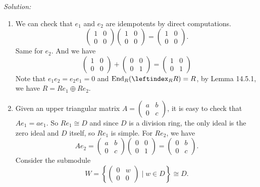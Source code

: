 \documentclass[a4paper, 12pt]{article}
\newenvironment{solution}
    {\textit{Solution:}}
    {}
\begin{document}
\begin{solution}
\begin{enumerate}[(1)]
\item We can check that \(e_1\) and \(e_2\) are idempotents by direct computations.
\[\begin{pmatrix}
    1&0\\ 
    0&0
\end{pmatrix}\begin{pmatrix}
    1&0\\ 
    0&0
\end{pmatrix}=\begin{pmatrix}
    1&0\\ 
    0&0
\end{pmatrix}.\]
Same for \(e_2\). And we have 
\[\begin{pmatrix}
    1&0\\ 
    0&0
\end{pmatrix}+\begin{pmatrix}
    0&0\\ 
    0&1
\end{pmatrix}=\begin{pmatrix}
    1&0\\ 
    0&1
\end{pmatrix}\]
Note that \(e_1e_2=e_2e_1=0\) and \(\text{End}_R(\leftindex_R R)=R\), by Lemma 14.5.1, we have \(R=Re_1\oplus Re_2\).
\item Given an upper triangular matrix \(A=\begin{pmatrix}
    a&b\\ 
    0&c
\end{pmatrix}\), it is easy to check that \(Ae_1=ae_1\). So \(Re_1\cong D\) and since \(D\) is a division ring, the only ideal is the zero ideal and \(D\) itself, so \(Re_1\) is simple. 
For \(Re_2\), we have 
\[Ae_2=\begin{pmatrix}
    a&b\\ 
    0&c
\end{pmatrix}\begin{pmatrix}
    0&0\\ 
    0&1
\end{pmatrix}=\begin{pmatrix}
    0&b\\ 
    0&c
\end{pmatrix}.\]
Consider the submodule 
\[W=\left\{ \begin{pmatrix}
0&w\\ 
0&0
\end{pmatrix}\mid w\in D \right\}\cong D.\]

\end{enumerate}
\end{solution}
\end{document}

